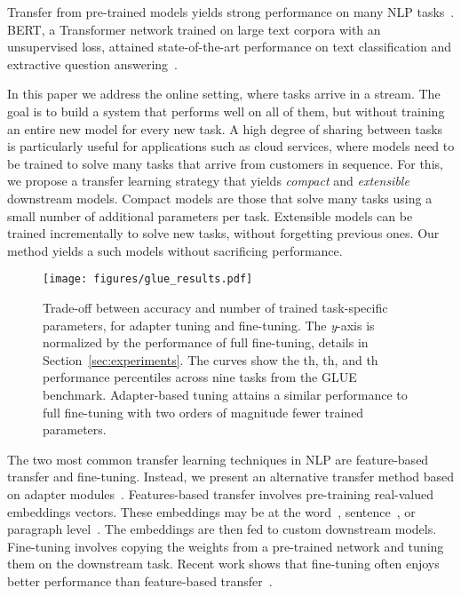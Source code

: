 \documentclass{article}
\begin{document}
Transfer from pre-trained models yields strong performance on many NLP tasks~\citep{dai2015,howard2018universal,radford2018improving}.
BERT, a Transformer network trained on large text corpora with an
unsupervised loss, attained state-of-the-art performance on text classification
and extractive question answering~\citep{devlin2018bert}.

In this paper we address the online setting, where tasks arrive in a stream.
The goal is to build a system that performs well on all of them, but without training an entire new model for every new task.
A high degree of sharing between tasks is particularly useful for applications such as cloud services,
where models need to be trained to solve many tasks that arrive from customers in sequence.
For this, we propose a transfer learning strategy that yields \emph{compact} and \emph{extensible} downstream models.
Compact models are those that solve many tasks using a small number of additional parameters per task.
Extensible models can be trained incrementally to solve new tasks, without forgetting previous ones.
Our method yields a such models without sacrificing performance.

\begin{figure}[t]
\centering
\texttt{[image: figures/glue\_results.pdf]}
\caption{
Trade-off between accuracy and number of trained task-specific parameters, for adapter tuning and fine-tuning.
The \emph{y}-axis is normalized by the performance of full fine-tuning, details in Section~\ref{sec:experiments}.
The curves show the th, th, and th performance percentiles across nine tasks from the GLUE benchmark.
Adapter-based tuning attains a similar performance to full fine-tuning with two orders of magnitude fewer trained parameters.}
\label{fig:glue_summary_results}
\end{figure}

The two most common transfer learning techniques in NLP are feature-based transfer and fine-tuning.
Instead, we present an alternative transfer method based on adapter modules~\citep{rebuffi2017}.
Features-based transfer involves pre-training real-valued embeddings vectors.
These embeddings may be at the word~\citep{mikolov2013}, sentence~\citep{cer2019}, or paragraph level~\citep{le2014}.
The embeddings are then fed to custom downstream models.
Fine-tuning involves copying the weights from a pre-trained network and tuning them on the downstream task.
Recent work shows that fine-tuning often enjoys better performance than feature-based transfer~\citep{howard2018universal}.
\end{document}
